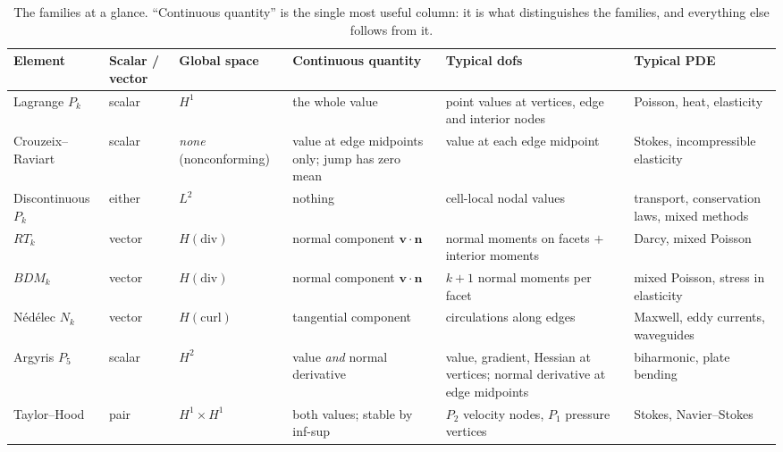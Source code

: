 \documentclass[11pt,a4paper]{article}
\newcommand{\Hdiv}{H(\mathrm{div})}
\newcommand{\Hcurl}{H(\mathrm{curl})}
\newcommand{\bn}{\mathbf{n}}
\newcommand{\bv}{\mathbf{v}}
\newcommand{\cH}[1]{\textcolor{cH1}{#1}}
\newcommand{\cC}[1]{\textcolor{cHcurl}{#1}}
\newcommand{\cD}[1]{\textcolor{cHdiv}{#1}}
\newcommand{\cL}[1]{\textcolor{cL2}{#1}}
\begin{document}
\begin{table}[htbp]
\centering
\footnotesize
\setlength{\tabcolsep}{4.2pt}
\renewcommand{\arraystretch}{1.28}
\caption{The families at a glance. ``Continuous quantity'' is the single most
useful column: it is what distinguishes the families, and everything else
follows from it.}
\label{tab:all}
\begin{tabular}{@{}>{\raggedright\arraybackslash}p{2.25cm}
                  >{\raggedright\arraybackslash}p{1.25cm}
                  >{\raggedright\arraybackslash}p{1.35cm}
                  >{\raggedright\arraybackslash}p{2.6cm}
                  >{\raggedright\arraybackslash}p{2.85cm}
                  >{\raggedright\arraybackslash}p{2.7cm}@{}}
\toprule
\textbf{Element} & \textbf{Scalar / vector} & \textbf{Global space} &
\textbf{Continuous quantity} & \textbf{Typical dofs} & \textbf{Typical PDE} \\
\midrule

\cH{Lagrange $P_k$} & scalar & $H^1$ &
the whole value & point values at vertices, edge and interior nodes &
Poisson, heat, elasticity \\

\textcolor{cCR}{Crouzeix--Raviart} & scalar & \emph{none} (nonconforming) &
value at edge midpoints only; jump has zero mean &
value at each edge midpoint &
Stokes, incompressible elasticity \\

\cL{Discontinuous $P_k$} & either & $L^2$ &
nothing & cell-local nodal values &
transport, conservation laws, mixed methods \\

\cD{$RT_k$} & vector & $\Hdiv$ &
normal component $\bv\cdot\bn$ &
normal moments on facets $+$ interior moments &
Darcy, mixed Poisson \\

\cD{$BDM_k$} & vector & $\Hdiv$ &
normal component $\bv\cdot\bn$ &
$k+1$ normal moments per facet &
mixed Poisson, stress in elasticity \\

\cC{Nédélec $N_k$} & vector & $\Hcurl$ &
tangential component &
circulations along edges &
Maxwell, eddy currents, waveguides \\

\textcolor{cInk}{Argyris $P_5$} & scalar & $H^2$ &
value \emph{and} normal derivative &
value, gradient, Hessian at vertices; normal derivative at edge midpoints &
biharmonic, plate bending \\

\cH{Taylor--Hood} & pair & $H^1 \times H^1$ &
both values; stable by inf-sup &
$P_2$ velocity nodes, $P_1$ pressure vertices &
Stokes, Navier--Stokes \\

\bottomrule
\end{tabular}
\end{table}
\end{document}
